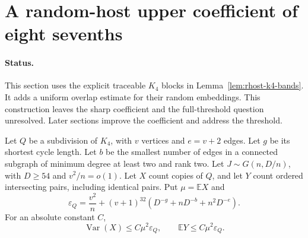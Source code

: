 \section{A random-host upper coefficient of eight sevenths}
\label{sec:rhost-eight-sevenths}

\paragraph{Status.}
This section uses the explicit traceable $K_4$ blocks in Lemma~\ref{lem:rhost-k4-bands}.
It adds a uniform overlap estimate for their random embeddings.
This construction leaves the sharp coefficient and the full-threshold question unresolved.
Later sections improve the coefficient and address the threshold.

\begin{lemma}
\label{lem:rhost-k4-moments}
Let $Q$ be a subdivision of $K_4$, with $v$ vertices and $e=v+2$ edges.
Let $g$ be its shortest cycle length.
Let $b$ be the smallest number of edges in a connected subgraph of minimum degree at least two and rank two.
Let $J\sim G(n,D/n)$, with $D\ge54$ and $v^2/n=o(1)$.
Let $X$ count copies of $Q$, and let $Y$ count ordered intersecting pairs, including identical pairs.
Put $\mu=\mathbb E X$ and
\[
 \varepsilon_Q=\frac{v^2}{n}
 +(v+1)^{32}\left(D^{-g}+nD^{-b}+n^2D^{-e}\right).
\]
For an absolute constant $C$,
\[
 \operatorname{Var}(X)\le C\mu^2\varepsilon_Q,
 \qquad \mathbb E Y\le C\mu^2\varepsilon_Q.
\]
\end{lemma}

